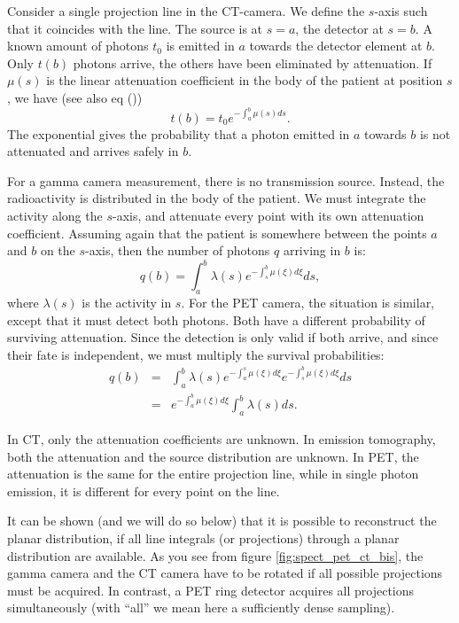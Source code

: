 Consider a single projection line in the CT-camera. We define the $s$-axis
such that it coincides with the line. The source is at $s=a$, the detector at
$s = b$. A known amount of photons $t_0$ is emitted in $a$ towards the
detector element at $b$. Only $t(b)$ photons arrive, the others have been
eliminated by attenuation. If $\mu(s)$ is the linear attenuation coefficient
in the body of the patient at position $s$, we have (see also eq
())
\begin{equation}
  t(b) = t_0 e^{- \int_a^b \mu(s) ds}. \label{eq:ct_proj}
\end{equation}
The exponential gives the probability that a photon emitted in $a$ towards $b$
is not attenuated and arrives safely in $b$.

For a gamma camera measurement, there is no transmission source. Instead, the
radioactivity is distributed in the body of the patient. We must integrate the
activity along the $s$-axis, and attenuate every point with its own
attenuation coefficient. Assuming again that the patient is somewhere between
the points $a$ and $b$ on the $s$-axis, then the number of photons $q$ arriving
in $b$ is:
\begin{equation}
  q(b) = \int_a^b \lambda(s) e^{- \int_s^b \mu(\xi) d\xi} ds,
   \label{eq:spect_proj}
\end{equation}
where $\lambda(s)$ is the activity in $s$.
For the PET camera, the situation is similar, except that it must detect both
photons. Both have a different probability of surviving attenuation. Since the
detection is only valid if both arrive, and since their fate is independent,
we must multiply the survival probabilities:
\begin{eqnarray}
  q(b) & = & \int_a^b \lambda(s) e^{- \int_a^s \mu(\xi) d\xi} 
                             e^{- \int_s^b \mu(\xi) d\xi} ds \\
  & = & e^{- \int_a^b \mu(\xi) d\xi} \int_a^b \lambda(s) ds.
        \label{eq:pet_proj}
\end{eqnarray}

In CT, only the attenuation coefficients are unknown. In emission tomography,
both the attenuation and the source distribution are unknown. In PET, the
attenuation is the same for the entire projection line, while in single photon
emission, it is different for every point on the line.

It can be shown (and we will do so below) that it is possible to reconstruct
the planar distribution, if all line integrals (or projections) through a
planar distribution are available. As you see from figure
\ref{fig:spect_pet_ct_bis}, the gamma camera and the CT camera have to be
rotated if all possible projections must be acquired. In contrast, a PET ring
detector acquires all projections simultaneously (with ``all'' we mean here a
sufficiently dense sampling).

